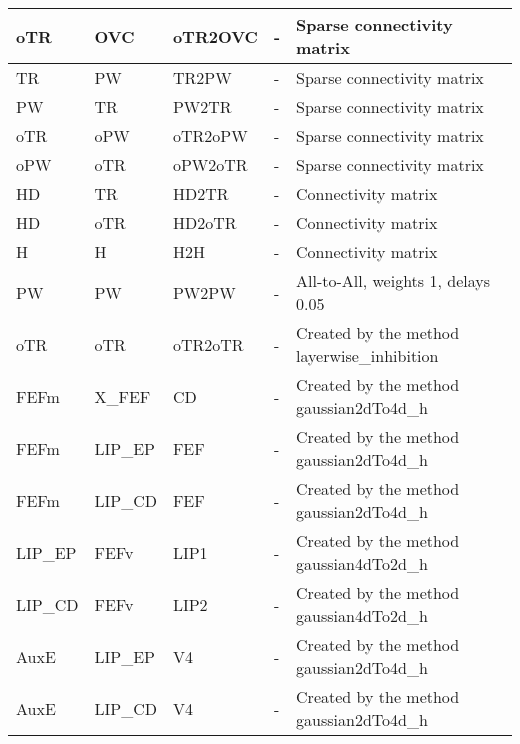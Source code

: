 \documentclass{article}
\begin{document}
\begin{xltabular}{\linewidth}{|l|l|l|X|X|}
    oTR & OVC & oTR2OVC & - &
    Sparse connectivity matrix \\ \hline

    TR & PW & TR2PW & - &
    Sparse connectivity matrix \\ \hline

    PW & TR & PW2TR & - &
    Sparse connectivity matrix \\ \hline

    oTR & oPW & oTR2oPW & - &
    Sparse connectivity matrix \\ \hline

    oPW & oTR & oPW2oTR & - &
    Sparse connectivity matrix \\ \hline

    HD & TR & HD2TR & - &
    Connectivity matrix \\ \hline

    HD & oTR & HD2oTR & - &
    Connectivity matrix \\ \hline

    H & H & H2H & - &
    Connectivity matrix \\ \hline

    PW & PW & PW2PW & - &
    All-to-All, weights 1, delays 0.05 \\ \hline

    oTR & oTR & oTR2oTR & - &
    Created by the method layerwise\_inhibition \\ \hline

    FEFm & X\_FEF & CD & - &
    Created by the method gaussian2dTo4d\_h \\ \hline

    FEFm & LIP\_EP & FEF & - &
    Created by the method gaussian2dTo4d\_h \\ \hline

    FEFm & LIP\_CD & FEF & - &
    Created by the method gaussian2dTo4d\_h \\ \hline

    LIP\_EP & FEFv & LIP1 & - &
    Created by the method gaussian4dTo2d\_h \\ \hline

    LIP\_CD & FEFv & LIP2 & - &
    Created by the method gaussian4dTo2d\_h \\ \hline

    AuxE & LIP\_EP & V4 & - &
    Created by the method gaussian2dTo4d\_h \\ \hline

    AuxE & LIP\_CD & V4 & - &
    Created by the method gaussian2dTo4d\_h \\ \hline
 
\end{xltabular}
\end{document}

